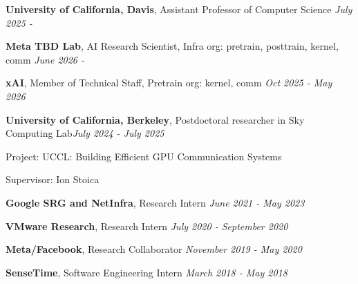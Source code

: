 \documentclass[letterpaper, 11pt]{article}
\newcommand\toRight{\hspace*{0pt}\hfill}
\newenvironment{compactlist}%
  {\begin{list}{}{}%
    \vspace{-0.06in}
    \setlength{\itemsep}{0pt}%
    \setlength{\parskip}{0pt}}%
  {\end{list}}
\begin{document}
\begin{list}{}{\setlength{\leftmargin}{0in}}
    \setlength{\itemsep}{0pt}%
    \setlength{\parskip}{2pt}%

\item \noindent \textbf{University of California, Davis}, Assistant Professor of Computer Science \toRight \textit{July 2025 - }

\item \noindent \textbf{Meta TBD Lab}, AI Research Scientist, Infra org: pretrain, posttrain, kernel, comm \toRight \textit{June 2026 - }

\item \noindent \textbf{xAI}, Member of Technical Staff, Pretrain org: kernel, comm \toRight \textit{Oct 2025 - May 2026}

\item {\bf University of California, Berkeley}, Postdoctoral researcher in Sky Computing Lab\toRight \textit{July 2024 - July 2025}
\begin{compactlist}
    \item Project: UCCL: Building Efficient GPU Communication Systems
    \item Supervisor: Ion Stoica 
    \vspace{-0.06in}
\end{compactlist}
    
\item \noindent \textbf{Google SRG and NetInfra}, Research Intern \toRight \textit{June 2021 - May 2023}

\item \noindent \textbf{VMware Research}, Research Intern \toRight \textit{July 2020 - September 2020}

\item \noindent \textbf{Meta/Facebook}, Research Collaborator \toRight \textit{November 2019 - May 2020}

\item \noindent \textbf{SenseTime}, Software Engineering Intern \toRight \textit{March 2018 - May 2018}

\end{list}
\end{document}
